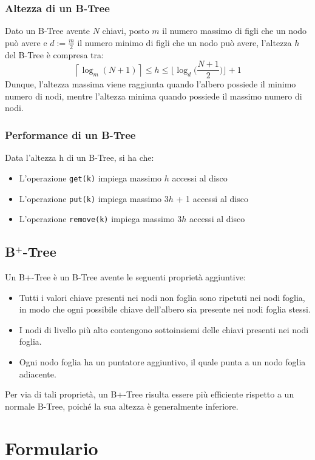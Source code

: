 \documentclass{article}
\begin{document}
\subsubsection{Altezza di un B-Tree}
Dato un B-Tree avente $N$ chiavi, posto $m$ il numero massimo di figli che un nodo può avere e $d := \frac{m}{2}$ il numero minimo di figli che un nodo può avere, l'altezza $h$ del B-Tree è compresa tra:
\[
\left\lceil \log_m(N+1) \right\rceil \leq h \leq \biggl\lfloor \log_d \biggl( \frac{N+1}{2} \biggr) \biggr\rfloor + 1
\]
Dunque, l'altezza massima viene raggiunta quando l'albero possiede il minimo numero di nodi, mentre l'altezza minima quando possiede il massimo numero di nodi.
\subsubsection{Performance di un B-Tree}
Data l'altezza h di un B-Tree, si ha che:
\begin{itemize}
  \item L'operazione \texttt{get(k)} impiega massimo $h$ accessi al disco
  \item L'operazione \texttt{put(k)} impiega massimo 3$h$ + 1 accessi al disco 
  \item L'operazione \texttt{remove(k)} impiega massimo 3$h$ accessi al disco
\end{itemize}

\subsection{B$^+$-Tree}
Un B+-Tree è un B-Tree avente le seguenti proprietà aggiuntive:
\begin{itemize}
    \item Tutti i valori chiave presenti nei nodi non foglia sono ripetuti nei nodi foglia, in modo che ogni possibile chiave dell'albero sia presente nei nodi foglia stessi.
    \item I nodi di livello più alto contengono sottoinsiemi delle chiavi presenti nei nodi foglia.
    \item Ogni nodo foglia ha un puntatore aggiuntivo, il quale punta a un nodo foglia adiacente.
\end{itemize}
Per via di tali proprietà, un B+-Tree risulta essere più efficiente rispetto a un normale B-Tree, poiché la sua altezza è generalmente inferiore.

\pagebreak
\section{Formulario}
\end{document}
